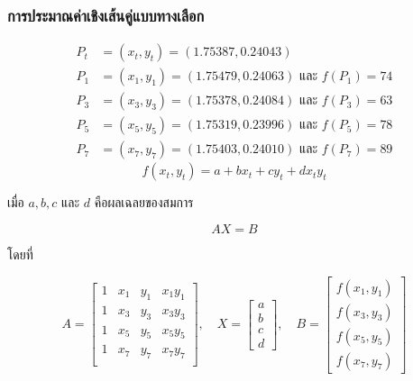 \documentclass[12pt,aspectratio=169]{beamer}
\begin{document}
\begin{frame}
    \frametitle{การประมาณค่าเชิงเส้นคู่แบบทางเลือก}
    \begin{align*}
        P_t &= (x_t,y_t)=(1.75387,0.24043) \\
        P_1& =(x_1,y_1)=(1.75479,0.24063) \text{ และ } f(P_1) = 74 \\
        P_3&=(x_3,y_3)=(1.75378,0.24084) \text{ และ } f(P_3) = 63\\ 
        P_5&=(x_5,y_5)=(1.75319,0.23996) \text{ และ } f(P_5) = 78\\
        P_7&=(x_7,y_7)=(1.75403,0.24010) \text{ และ } f(P_7) = 89
     \end{align*}
    \begin{equation}\label{alternative-bilinear-interpolation7}
        f(x_t,y_t)=a+bx_t+cy_t+dx_ty_t
   \end{equation}
   
   เมื่อ $a,b,c$ และ $d$ คือผลเฉลยของสมการ 
   
   \begin{equation}\label{linear-system-equation}
      AX = B  
   \end{equation}
   
   โดยที่
   
   \begin{equation*}
   A
   =\begin{bmatrix}
   1 & x_1 & y_1 & x_1y_1\\
   1 & x_3 & y_3 & x_3y_3\\
   1 & x_5 & y_5 & x_5y_5\\
   1 & x_7 & y_7 & x_7y_7\\
   \end{bmatrix}
   ,
   \quad
   X
   =\begin{bmatrix}
      a\\
      b\\
      c\\	
      d
   \end{bmatrix}
   ,
   \quad
   B
   =\begin{bmatrix}
      f(x_1,y_1)\\
      f(x_3,y_3)\\
      f(x_5,y_5)\\
      f(x_7,y_7)
   \end{bmatrix}
   \end{equation*}
\end{frame}
\end{document}
